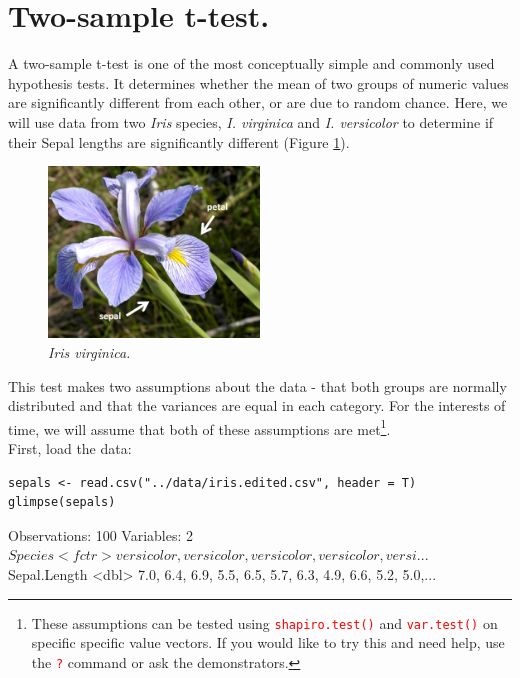 \documentclass[a4paper,12pt]{article}
\newcommand\code[1]{\textcolor{red}{\texttt{#1}}}
\begin{document}
\section{Two-sample t-test.}

A two-sample t-test is one of the most conceptually simple and commonly used hypothesis tests. It determines whether the mean of two groups of numeric values are significantly different from each other, or are due to random chance. Here, we will use data from two \textit{Iris} species, \textit{I. virginica} and \textit{I. versicolor} to determine if their Sepal lengths are significantly different (Figure \ref{fig:IrisVirginica}). \\

\begin{figure}[h]
\centering 
\includegraphics[width=0.5\textwidth]{figs/Irisvirginica.jpg}
\caption{\textit{Iris virginica.}}
\label{fig:IrisVirginica}
\end{figure} 

This test makes two assumptions about the data - that both groups are normally distributed and that the variances are equal in each category. For the interests of time, we will assume that both of these assumptions are met\footnote{These assumptions can be tested using \code{shapiro.test()} and \code{var.test()} on specific specific value vectors. If you would like to try this and need help, use the \code{?} command or ask the demonstrators.}.\\

First, load the data:

\begin{shaded}
\begin{verbatim}
sepals <- read.csv("../data/iris.edited.csv", header = T)
glimpse(sepals)
\end{verbatim}


\begin{Schunk}
\begin{Soutput}
Observations: 100
Variables: 2
$ Species      <fctr> versicolor, versicolor, versicolor, versicolor, versi...
$ Sepal.Length <dbl> 7.0, 6.4, 6.9, 5.5, 6.5, 5.7, 6.3, 4.9, 6.6, 5.2, 5.0,...
\end{Soutput}
\end{Schunk}
\end{shaded}
\end{document}
